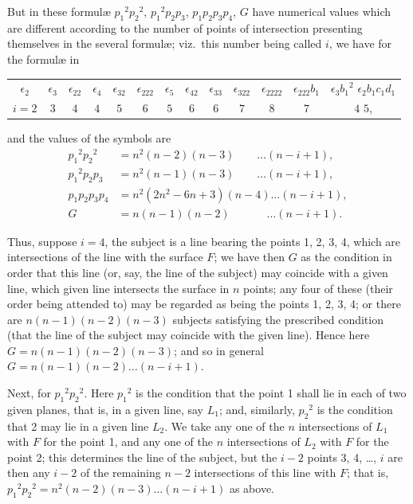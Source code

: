 \documentclass[11pt,a4paper]{book}
\begin{document}
But in these formul\ae{} ${p_1}^2{p_2}^2$, ${p_1}^2p_2p_3$, $p_1p_2p_3p_4$, $G$ have numerical values which are different according to the number of points of intersection presenting themselves in the several formul\ae{}; viz.\ this number being called $i$, we have for the formul\ae{} in
\begin{center}
\begin{tabular}{c c c c c c c c c c c c c}
$\epsilon_2$ & $\epsilon_3$ & $\epsilon_{22}$ & $\epsilon_4$ & $\epsilon_{32}$ & $\epsilon_{222}$ & $\epsilon_5$ & $\epsilon_{42}$ & $\epsilon_{33}$ & $\epsilon_{322}$ & $\epsilon_{2222}$ & $\epsilon_{222}b_1$ & $\epsilon_3{b_1}^2$ \quad $\epsilon_2b_1c_1d_1$ \\
$i = 2$ & $3$ & $4$ & $4$ & $5$ & $6$ & $5$ & $6$ & $6$ & $7$ & $8$ & $7$ & $4$ \qquad $5$,
\end{tabular}
\end{center}
and the values of the symbols are
\begin{align*}
{p_1}^2{p_2}^2 &= n^2(n-2)(n-3) \quad\quad \ldots (n-i+1), \\
{p_1}^2p_2p_3 &= n^2(n-1)(n-3) \quad\quad \ldots (n-i+1), \\
p_1p_2p_3p_4 &= n^2(2n^2 - 6n + 3)(n-4) \ldots (n-i+1), \\
G &= n(n-1)(n-2) \quad\quad\quad\; \ldots (n-i+1).
\end{align*}

Thus, suppose $i = 4$, the subject is a line bearing the points 1, 2, 3, 4, which are intersections of the line with the surface $F$; we have then $G$ as the condition in order that this line (or, say, the line of the subject) may coincide with a given line, which given line intersects the surface in $n$ points; any four of these (their order being attended to) may be regarded as being the points 1, 2, 3, 4; or there are $n(n-1)(n-2)(n-3)$ subjects satisfying the prescribed condition (that the line of the subject may coincide with the given line). Hence here $G = n(n-1)(n-2)(n-3)$; and so in general $G = n(n-1)(n-2)\ldots(n-i+1)$.

Next, for ${p_1}^2{p_2}^2$. Here ${p_1}^2$ is the condition that the point 1 shall lie in each of two given planes, that is, in a given line, say $L_1$; and, similarly, ${p_2}^2$ is the condition that 2 may lie in a given line $L_2$. We take any one of the $n$ intersections of $L_1$ with $F$ for the point 1, and any one of the $n$ intersections of $L_2$ with $F$ for the point 2; this determines the line of the subject, but the $i-2$ points 3, 4, \ldots, $i$ are then any $i-2$ of the remaining $n-2$ intersections of this line with $F$; that is, ${p_1}^2{p_2}^2 = n^2(n-2)(n-3)\ldots(n-i+1)$ as above.
\end{document}
